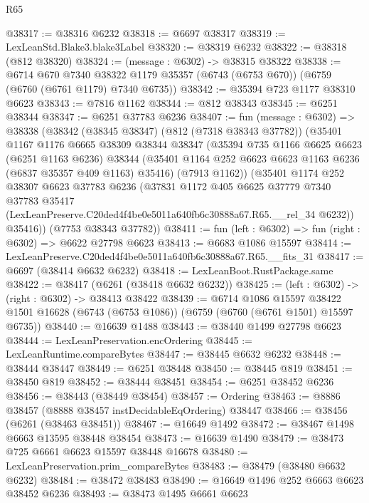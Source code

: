 \begin{lexlean}{R65}
\begin{coremodule}
{@38317 := @38316 @6232
@38318 := @6697 @38317
@38319 := LexLeanStd.Blake3.blake3Label
@38320 := @38319 @6232
@38322 := @38318 (@812 @38320)
@38324 := (message : @6302) -> @38315 @38322
@38338 := @6714
    @670
    @7340
    @38322
    @1179
    @35357
    (@6743 (@6753 @670))
    (@6759 (@6760 (@6761 @1179) @7340 @6735))
@38342 := @35394 @723 @1177 @38310 @6623
@38343 := @7816 @1162
@38344 := @812 @38343
@38345 := @6251 @38344
@38347 := @6251 @37783 @6236
@38407 := fun (message : @6302) =>
  @38338
    (@38342
      (@38345 @38347)
      (@812 (@7318 @38343 @37782))
      (@35401
        @1167
        @1176
        @6665
        @38309
        @38344
        @38347
        (@35394
          @735
          @1166
          @6625
          @6623
          (@6251 @1163 @6236)
          @38344
          (@35401 @1164 @252 @6623 @6623 @1163 @6236 (@6837 @35357 @409 @1163) @35416)
          (@7913 @1162))
        (@35401
          @1174
          @252
          @38307
          @6623
          @37783
          @6236
          (@37831
            @1172
            @405
            @6625
            @37779
            @7340
            @37783
            @35417
            (LexLeanPreserve.C20ded4f4be0e5011a640fb6c30888a67.R65.__rel_34 @6232))
          @35416))
      (@7753 @38343 @37782))
@38411 := fun (left : @6302) => fun (right : @6302) => @6622 @27798 @6623
@38413 := @6683 @1086 @15597
@38414 := LexLeanPreserve.C20ded4f4be0e5011a640fb6c30888a67.R65.__fits_31
@38417 := @6697 (@38414 @6632 @6232)
@38418 := LexLeanBoot.RustPackage.same
@38422 := @38417 (@6261 (@38418 @6632 @6232))
@38425 := (left : @6302) -> (right : @6302) -> @38413 @38422
@38439 := @6714
    @1086
    @15597
    @38422
    @1501
    @16628
    (@6743 (@6753 @1086))
    (@6759 (@6760 (@6761 @1501) @15597 @6735))
@38440 := @16639 @1488
@38443 := @38440 @1499 @27798 @6623
@38444 := LexLeanPreservation.encOrdering
@38445 := LexLeanRuntime.compareBytes
@38447 := @38445 @6632 @6232
@38448 := @38444 @38447
@38449 := @6251 @38448
@38450 := @38445 @819
@38451 := @38450 @819
@38452 := @38444 @38451
@38454 := @6251 @38452 @6236
@38456 := @38443 (@38449 @38454)
@38457 := Ordering
@38463 := @8886 @38457 (@8888 @38457 instDecidableEqOrdering) @38447
@38466 := @38456 (@6261 (@38463 @38451))
@38467 := @16649 @1492
@38472 := @38467 @1498 @6663 @13595 @38448 @38454
@38473 := @16639 @1490
@38479 := @38473 @725 @6661 @6623 @15597 @38448 @16678
@38480 := LexLeanPreservation.prim_compareBytes
@38483 := @38479 (@38480 @6632 @6232)
@38484 := @38472 @38483
@38490 := @16649 @1496 @252 @6663 @6623 @38452 @6236
@38493 := @38473 @1495 @6661 @6623
}
\end{coremodule}
\end{lexlean}

